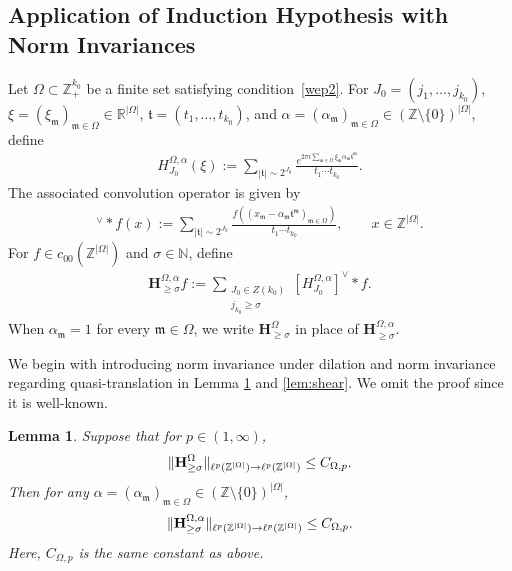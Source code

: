 \documentclass[11 pt,letterpaper]{amsart}
\theoremstyle{plain}
\newtheorem{lemma}{Lemma}\numberwithin{lemma}{section}
\theoremstyle{definition}
\theoremstyle{remark} \theoremstyle{exam} \theoremstyle{ob}
\numberwithin{equation}{section}
\begin{document}
\subsection{Application of Induction Hypothesis with Norm Invariances}
Let $\Omega \subset \mathbb{Z}_+^{k_0}$ be a finite set satisfying condition~\eqref{wep2}. 
For $J_0=(j_1,\ldots,j_{k_0})$, 
$\xi=(\xi_{\mathfrak{m}})_{\mathfrak{m}\in\Omega}\in\mathbb{R}^{|\Omega|}$,
$\mathfrak{t}=(t_1,\ldots,t_{k_0})$, and
$\alpha=(\alpha_{\mathfrak{m}})_{\mathfrak{m}\in\Omega}
\in(\mathbb{Z}\setminus\{0\})^{|\Omega|}$, define
\begin{align*}
	H_{J_0}^{\Omega,\alpha}(\xi)
	:=
	\sum_{|\mathfrak{t}|\sim 2^{J_0}}
	\frac{
		e^{2\pi i\sum_{\mathfrak{m}\in\Omega}
			\xi_{\mathfrak{m}}\alpha_{\mathfrak{m}}\mathfrak{t}^{\mathfrak{m}}}
	}{
		t_1\cdots t_{k_0}
	}.
\end{align*}
The associated convolution operator is given by
\begin{align*}
	[H_{J_0}^{\Omega,\alpha}]^\vee*f(x)
	:=
	\sum_{|\mathfrak{t}|\sim 2^{J_0}}
	\frac{
		f\!\left(
		(x_{\mathfrak{m}}
		-\alpha_{\mathfrak{m}}\mathfrak{t}^{\mathfrak{m}})
		_{\mathfrak{m}\in\Omega}
		\right)
	}{
		t_1\cdots t_{k_0}
	},
	\qquad x\in\mathbb{Z}^{|\Omega|}.
\end{align*}
 For $f\in c_{00}(\mathbb{Z}^{|\Omega|})$ and $\sigma\in\mathbb{N}$, define
\begin{align}\label{42cc}
	\mathbf{H}_{\geq \sigma}^{\Omega,\alpha}f
	:=
	\sum_{\substack{J_0\in Z(k_0)\\ j_{k_0}\geq \sigma}}
	[H_{J_0}^{\Omega,\alpha}]^\vee*f.
\end{align}
When $\alpha_{\mathfrak{m}}=1$ for every $\mathfrak{m}\in\Omega$, we write
$\mathbf{H}_{\geq \sigma}^{\Omega}$ in place of
$\mathbf{H}_{\geq \sigma}^{\Omega,\alpha}$.




We begin with introducing norm invariance under dilation and norm invariance regarding quasi-translation in Lemma \ref{c1} and \ref{lem:shear}. We omit the proof since it is well-known.

 
 
 \begin{lemma}\label{c1}
Suppose that for $p \in (1,\infty)$,
\[
\| {\bf H}_{\ge \sigma}^{\Omega} \|_{\ell^p(\mathbb{Z}^{|\Omega|}) \to \ell^p(\mathbb{Z}^{|\Omega|})}
\le C_{\Omega,p}.
\]
Then for any $\alpha=(\alpha_{\mathfrak m})_{\mathfrak m\in\Omega}\in (\mathbb{Z}\setminus\{0\})^{|\Omega|}$, 
\begin{align}\label{ind1}
\| {\bf H}_{\ge \sigma}^{\Omega,\alpha} \|_{\ell^p(\mathbb{Z}^{|\Omega|}) \to \ell^p(\mathbb{Z}^{|\Omega|})}
\le C_{\Omega,p}.
\end{align}
Here, $C_{\Omega,p}$ is the same constant as above.
\end{lemma}
\end{document}
